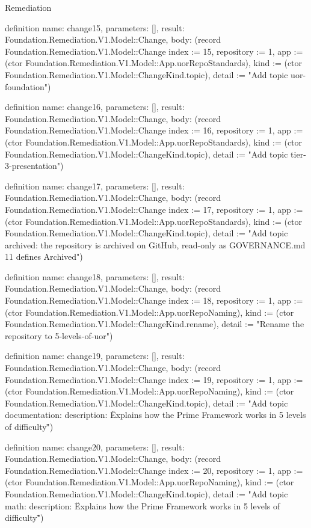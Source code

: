 \begin{lexlean}{Remediation}
\begin{semanticmodule}
definition{
  name: change15,
  parameters: [],
  result: Foundation.Remediation.V1.Model::Change,
  body: (record Foundation.Remediation.V1.Model::Change {index := 15, repository := 1, app := (ctor Foundation.Remediation.V1.Model::App.uorRepoStandards), kind := (ctor Foundation.Remediation.V1.Model::ChangeKind.topic), detail := "Add topic uor-foundation"})
}

definition{
  name: change16,
  parameters: [],
  result: Foundation.Remediation.V1.Model::Change,
  body: (record Foundation.Remediation.V1.Model::Change {index := 16, repository := 1, app := (ctor Foundation.Remediation.V1.Model::App.uorRepoStandards), kind := (ctor Foundation.Remediation.V1.Model::ChangeKind.topic), detail := "Add topic tier-3-presentation"})
}

definition{
  name: change17,
  parameters: [],
  result: Foundation.Remediation.V1.Model::Change,
  body: (record Foundation.Remediation.V1.Model::Change {index := 17, repository := 1, app := (ctor Foundation.Remediation.V1.Model::App.uorRepoStandards), kind := (ctor Foundation.Remediation.V1.Model::ChangeKind.topic), detail := "Add topic archived: the repository is archived on GitHub, read-only as GOVERNANCE.md 11 defines Archived"})
}

definition{
  name: change18,
  parameters: [],
  result: Foundation.Remediation.V1.Model::Change,
  body: (record Foundation.Remediation.V1.Model::Change {index := 18, repository := 1, app := (ctor Foundation.Remediation.V1.Model::App.uorRepoNaming), kind := (ctor Foundation.Remediation.V1.Model::ChangeKind.rename), detail := "Rename the repository to 5-levels-of-uor"})
}

definition{
  name: change19,
  parameters: [],
  result: Foundation.Remediation.V1.Model::Change,
  body: (record Foundation.Remediation.V1.Model::Change {index := 19, repository := 1, app := (ctor Foundation.Remediation.V1.Model::App.uorRepoNaming), kind := (ctor Foundation.Remediation.V1.Model::ChangeKind.topic), detail := "Add topic documentation: description: \"Explains how the Prime Framework works in 5 levels of difficulty\""})
}

definition{
  name: change20,
  parameters: [],
  result: Foundation.Remediation.V1.Model::Change,
  body: (record Foundation.Remediation.V1.Model::Change {index := 20, repository := 1, app := (ctor Foundation.Remediation.V1.Model::App.uorRepoNaming), kind := (ctor Foundation.Remediation.V1.Model::ChangeKind.topic), detail := "Add topic math: description: \"Explains how the Prime Framework works in 5 levels of difficulty\""})
}


\end{semanticmodule}
\end{lexlean}
